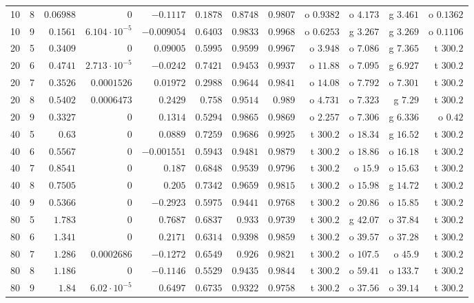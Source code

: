 \begin{table}[ht]
\begin{tabular}{@{}rrrrrrrrrrrr@{}}
10 & 8 & $0.06988$ & $0$ & $-0.1117$ & $0.1878$ & $0.8748$ & $0.9807$ & o $0.9382$ & o $4.173$ & g $3.461$ & o $0.1362$\\
10 & 9 & $0.1561$ & $6.104\cdot10^{-5}$ & $-0.009054$ & $0.6403$ & $0.9833$ & $0.9968$ & o $0.6253$ & g $3.267$ & g $3.269$ & o $0.1106$\\
20 & 5 & $0.3409$ & $0$ & $0.09005$ & $0.5995$ & $0.9599$ & $0.9967$ & o $3.948$ & o $7.086$ & g $7.365$ & t $300.2$\\
20 & 6 & $0.4741$ & $2.713\cdot10^{-5}$ & $-0.0242$ & $0.7421$ & $0.9453$ & $0.9937$ & o $11.88$ & o $7.095$ & g $6.927$ & t $300.2$\\
20 & 7 & $0.3526$ & $0.0001526$ & $0.01972$ & $0.2988$ & $0.9644$ & $0.9841$ & o $14.08$ & o $7.792$ & o $7.301$ & t $300.2$\\
20 & 8 & $0.5402$ & $0.0006473$ & $0.2429$ & $0.758$ & $0.9514$ & $0.989$ & o $4.731$ & o $7.323$ & g $7.29$ & t $300.2$\\
20 & 9 & $0.3327$ & $0$ & $0.1314$ & $0.5294$ & $0.9865$ & $0.9869$ & o $2.257$ & o $7.306$ & g $6.336$ & o $0.42$\\
40 & 5 & $0.63$ & $0$ & $0.0889$ & $0.7259$ & $0.9686$ & $0.9925$ & t $300.2$ & o $18.34$ & g $16.52$ & t $300.2$\\
40 & 6 & $0.5567$ & $0$ & $-0.001551$ & $0.5943$ & $0.9481$ & $0.9879$ & t $300.2$ & o $18.86$ & o $16.18$ & t $300.2$\\
40 & 7 & $0.8541$ & $0$ & $0.187$ & $0.6848$ & $0.9539$ & $0.9796$ & t $300.2$ & o $15.9$ & o $15.63$ & t $300.2$\\
40 & 8 & $0.7505$ & $0$ & $0.205$ & $0.7342$ & $0.9659$ & $0.9815$ & t $300.2$ & o $15.98$ & g $14.72$ & t $300.2$\\
40 & 9 & $0.5366$ & $0$ & $-0.2923$ & $0.5975$ & $0.9441$ & $0.9768$ & t $300.2$ & o $20.86$ & o $15.85$ & t $300.2$\\
80 & 5 & $1.783$ & $0$ & $0.7687$ & $0.6837$ & $0.933$ & $0.9739$ & t $300.2$ & g $42.07$ & o $37.84$ & t $300.2$\\
80 & 6 & $1.341$ & $0$ & $0.2171$ & $0.6314$ & $0.9398$ & $0.9859$ & t $300.2$ & o $39.57$ & o $37.28$ & t $300.2$\\
80 & 7 & $1.286$ & $0.0002686$ & $-0.1272$ & $0.6549$ & $0.926$ & $0.9821$ & t $300.2$ & o $107.5$ & o $45.9$ & t $300.2$\\
80 & 8 & $1.186$ & $0$ & $-0.1146$ & $0.5529$ & $0.9435$ & $0.9844$ & t $300.2$ & o $59.41$ & o $133.7$ & t $300.2$\\
80 & 9 & $1.84$ & $6.02\cdot10^{-5}$ & $0.6497$ & $0.6735$ & $0.9322$ & $0.9758$ & t $300.2$ & o $37.56$ & o $39.14$ & t $300.2$\\
\bottomrule
\end{tabular}
\end{table}

